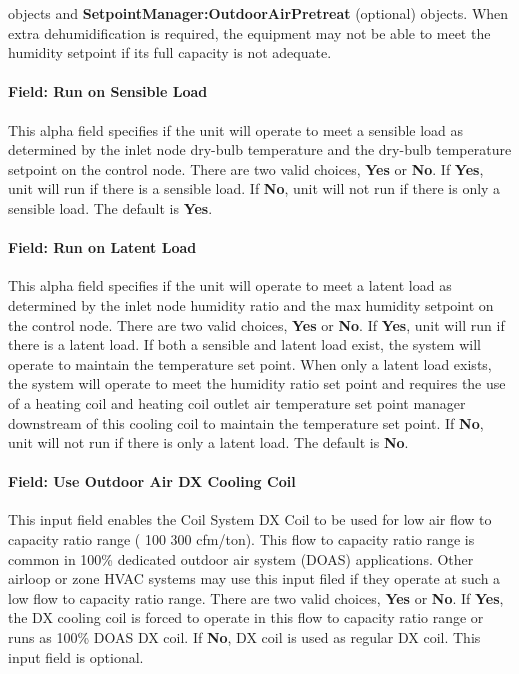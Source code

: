 objects and \textbf{SetpointManager:OutdoorAirPretreat} (optional) objects. When extra dehumidification is required, the equipment may not be able to meet the humidity setpoint if its full capacity is not adequate.

\paragraph{Field: Run on Sensible Load}\label{field-run-on-sensible-load}

This alpha field specifies if the unit will operate to meet a sensible load as determined by the inlet node dry-bulb temperature and the dry-bulb temperature setpoint on the control node. There are two valid choices, \textbf{Yes} or \textbf{No}. If \textbf{Yes}, unit will run if there is a sensible load. If \textbf{No}, unit will not run if there is only a sensible load. The default is \textbf{Yes}.

\paragraph{Field: Run on Latent Load}\label{field-run-on-latent-load}

This alpha field specifies if the unit will operate to meet a latent load as determined by the inlet node humidity ratio and the max humidity setpoint on the control node. There are two valid choices, \textbf{Yes} or \textbf{No}. If \textbf{Yes}, unit will run if there is a latent load. If both a sensible and latent load exist, the system will operate to maintain the temperature set point. When only a latent load exists, the system will operate to meet the humidity ratio set point and requires the use of a heating coil and heating coil outlet air temperature set point manager downstream of this cooling coil to maintain the temperature set point. If \textbf{No}, unit will not run if there is only a latent load. The default is \textbf{No}.

\paragraph{Field: Use Outdoor Air DX Cooling Coil}\label{field-use-outdoor-air-dx-cooling-coil}

This input field enables the Coil System DX Coil to be used for low air flow to capacity ratio range ( 100 300 cfm/ton). This flow to capacity ratio range is common in 100\% dedicated outdoor air system (DOAS) applications. Other airloop or zone HVAC systems may use this input filed if they operate at such a low flow to capacity ratio range. There are two valid choices, \textbf{Yes} or \textbf{No}. If \textbf{Yes}, the DX cooling coil is forced to operate in this flow to capacity ratio range or runs as 100\% DOAS DX coil. If \textbf{No}, DX coil is used as regular DX coil. This input field is optional.

